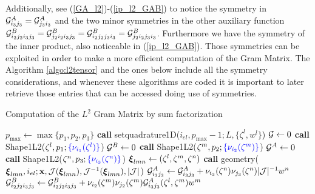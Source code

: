 Additionally, see (\ref{GA_l2})-(\ref{ip_l2_GAB}) to notice the symmetry in $\mathcal{G}_{i_3j_3}^A=\mathcal{G}_{j_3i_3}^A$ and the two minor symmetries in the other auxiliary function $\mathcal{G}_{i_2j_2i_3j_3}^B=\mathcal{G}_{j_2i_2i_3j_3}^B=\mathcal{G}_{i_2j_2j_3i_3}^B=\mathcal{G}_{j_2i_2j_3i_3}^B$. Furthermore we have the symmetry of the inner product, also noticeable in (\ref{ip_l2_GAB}). Those symmetries can be exploited in order to make a more efficient computation of the Gram Matrix. The Algorithm \ref{algo:l2tensor} and the ones below include all the symmetry considerations, and whenever these algorithms are coded it is important to later retrieve those entries that can be accessed doing use of symmetries.

\begin{algorithm}[ht]
\caption{Computation of the $L^2$ Gram Matrix by sum factorization}\label{algo:l2tensor}
\begin{algorithmic}
\State $p_{\max}\gets\max\{p_1,p_2,p_3\}$
\State\textbf{call }setquadrature1D($i_{el},p_{\max}-1;L,\{\zeta^l,w^l\}$)
\State $\mathcal{G}\gets 0$
    \State\textbf{call } Shape1L2($\zeta^l,p_1;{\color{blue}\{\nu_{i_1}(\zeta^l)\}}$) 
            \State $\mathcal{G}^B\gets 0$
                \State\textbf{call } Shape1L2($\zeta^m,p_2;{\color{blue}\{\nu_{i_2}(\zeta^m)\}}$) 
                \State $\mathcal{G}^A\gets 0$
                    \State\textbf{call } Shape1L2($\zeta^n,p_3;{\color{blue}\{\nu_{i_3}(\zeta^n)\}}$) 
                    \State $\boldsymbol{\xi}_{lmn}\gets (\zeta^l,\zeta^m,\zeta^n)$
                    \State\textbf{call } geometry( $\boldsymbol{\xi}_{lmn},i_{el};\mathbf{x},\mathcal{J}(\boldsymbol{\xi}_{lmn}),\mathcal{J}^{-1}(\boldsymbol{\xi}_{lmn}),|\mathcal{J}|$)
                    \State$\mathcal{G}_{i_3j_3}^A\gets \mathcal{G}_{i_3j_3}^A+ \nu_{i_3}(\zeta^n)\nu_{j_3}(\zeta^n)|\mathcal{J}|^{-1}w^n$ 
                \EndFor
                        \State$\mathcal{G}_{i_2j_2i_3j_3}^B\gets \mathcal{G}_{i_2j_2i_3j_3}^B+ \nu_{i_2}(\zeta^m)\nu_{j_2}(\zeta^m)\mathcal{G}_{i_3j_3}^A(\zeta^l,\zeta^m)w^m$ 

\end{algorithmic}
\end{algorithm}
